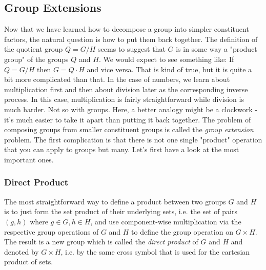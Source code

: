 \subsection{Group Extensions}
Now that we have learned how to decompose a group into simpler constituent factors, the natural question is how to put them back together. The definition of the quotient group $Q = G / H$ seems to suggest that $G$ is in some way a "product group" of the groups $Q$ and $H$. We would expect to see something like: If $Q = G / H$ then $G = Q \cdot H$ and vice versa. That is kind of true, but it is quite a bit more complicated than that. In the case of numbers, we learn about multiplication first and then about division later as the corresponding inverse process. In this case, multiplication is fairly straightforward while division is much harder. Not so with groups. Here, a better analogy might be a clockwork - it's much easier to take it apart than putting it back together. The problem of composing groups from smaller constituent groups is called the \emph{group extension} problem. The first complication is that there is not one single "product" operation that you can apply to groups but many. Let's first have a look at the most important ones.


\subsubsection{Direct Product}
The most straightforward way to define a product between two groups $G$ and $H$ is to just form the set product of their underlying sets, i.e. the set of pairs $(g,h)$ where $g \in G, h \in H$, and use component-wise multiplication via the respective group operations of $G$ and $H$ to define the group operation on $G \times H$. The result is a new group which is called the \emph{direct product} of $G$ and $H$ and denoted by $G \times H$, i.e. by the same cross symbol that is used for the cartesian product of sets. 



